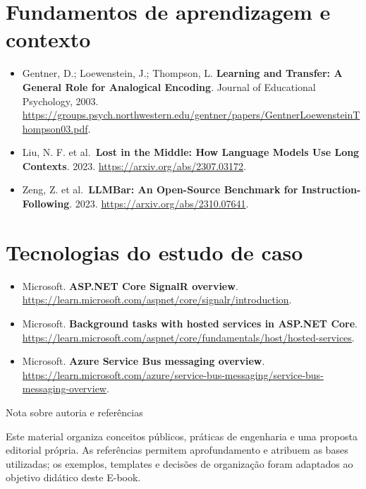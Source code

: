 \documentclass[
  10pt,
  a4paper,
  oneside]{book}
\providecommand{\tightlist}{%
  \setlength{\itemsep}{0pt}\setlength{\parskip}{0pt}}
\begin{document}
\hypertarget{fundamentos-de-aprendizagem-e-contexto}{%
\section{Fundamentos de aprendizagem e
contexto}\label{fundamentos-de-aprendizagem-e-contexto}}

\begin{itemize}
\tightlist
\item
  Gentner, D.; Loewenstein, J.; Thompson, L. \textbf{Learning and
  Transfer: A General Role for Analogical Encoding}. Journal of
  Educational Psychology, 2003.
  \url{https://groups.psych.northwestern.edu/gentner/papers/GentnerLoewensteinThompson03.pdf}.
\item
  Liu, N. F. et al.~\textbf{Lost in the Middle: How Language Models Use
  Long Contexts}. 2023. \url{https://arxiv.org/abs/2307.03172}.
\item
  Zeng, Z. et al.~\textbf{LLMBar: An Open-Source Benchmark for
  Instruction-Following}. 2023. \url{https://arxiv.org/abs/2310.07641}.
\end{itemize}

\hypertarget{tecnologias-do-estudo-de-caso}{%
\section{Tecnologias do estudo de
caso}\label{tecnologias-do-estudo-de-caso}}

\begin{itemize}
\tightlist
\item
  Microsoft. \textbf{ASP.NET Core SignalR overview}.
  \url{https://learn.microsoft.com/aspnet/core/signalr/introduction}.
\item
  Microsoft. \textbf{Background tasks with hosted services in ASP.NET
  Core}.
  \url{https://learn.microsoft.com/aspnet/core/fundamentals/host/hosted-services}.
\item
  Microsoft. \textbf{Azure Service Bus messaging overview}.
  \url{https://learn.microsoft.com/azure/service-bus-messaging/service-bus-messaging-overview}.
\end{itemize}

\enlargethispage{3\baselineskip}

\begin{infobox}{Nota sobre autoria e referências}

Este material organiza conceitos públicos, práticas de engenharia e uma
proposta editorial própria. As referências permitem aprofundamento e
atribuem as bases utilizadas; os exemplos, templates e decisões de
organização foram adaptados ao objetivo didático deste E-book.

\end{infobox}

\backmatter
\end{document}
